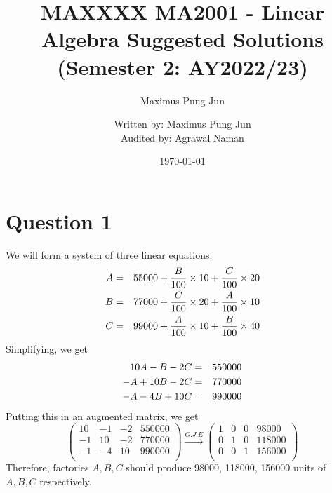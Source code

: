\documentclass{article}
\title{MAXXXX}
\author{Maximus Pung Jun}
\date{\today}
\title{%
  MA2001 - Linear Algebra Suggested Solutions  \\ 
  \large (Semester 2: AY2022/23) \\ }
\author{%
  \large
    Written by: Maximus Pung Jun \\
    Audited by: Agrawal Naman}
\date{}
\begin{document}
\maketitle 

\section*{Question 1}
We will form a system of three linear equations.
\begin{eqnarray}
    A &=& 55000 + \frac{B}{100}\times 10 +\frac{C}{100}\times 20 \notag\\
    B &=& 77000 + \frac{C}{100}\times 20 +\frac{A}{100}\times 10 \notag\\
    C &=& 99000 + \frac{A}{100}\times 10 +\frac{B}{100}\times 40 \notag
\end{eqnarray}
Simplifying, we get
\begin{eqnarray}
    10A - B - 2C &=& 550000 \notag\\
    -A+10B -2C &=& 770000 \notag\\
    -A - 4B+10C &=& 990000 \notag
\end{eqnarray}
Putting this in an augmented matrix, we get
$$\left(\begin{array}{ccc|c}
     10 & -1 & -2 & 550000\\
     -1 & 10 & -2 & 770000\\
     -1 & -4 & 10 & 990000\\
    \end{array}\right) \xrightarrow[]{G.J.E}
    \left(\begin{array}{ccc|c}
     1 & 0 & 0 & 98000\\
     0 & 1 & 0 & 118000\\
     0 & 0 & 1 & 156000\\
    \end{array}\right)$$
Therefore, factories $A,B,C$ should produce 98000, 118000, 156000 units of $A,B,C$ respectively.
\newpage
\end{document}

